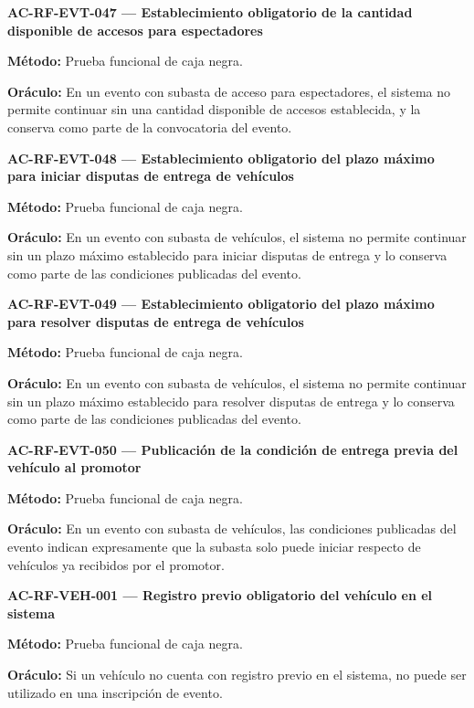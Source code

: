 \documentclass[10pt,letterpaper]{article}
\begin{document}
\noindent\textbf{AC-RF-EVT-047 --- Establecimiento obligatorio de la cantidad disponible de accesos para espectadores}\par
\textbf{Método:} Prueba funcional de caja negra.\par
\textbf{Oráculo:} En un evento con subasta de acceso para espectadores, el sistema no permite continuar sin una cantidad disponible de accesos establecida, y la conserva como parte de la convocatoria del evento.\par\vspace{0.45em}
\noindent\textbf{AC-RF-EVT-048 --- Establecimiento obligatorio del plazo máximo para iniciar disputas de entrega de vehículos}\par
\textbf{Método:} Prueba funcional de caja negra.\par
\textbf{Oráculo:} En un evento con subasta de vehículos, el sistema no permite continuar sin un plazo máximo establecido para iniciar disputas de entrega y lo conserva como parte de las condiciones publicadas del evento.\par\vspace{0.45em}
\noindent\textbf{AC-RF-EVT-049 --- Establecimiento obligatorio del plazo máximo para resolver disputas de entrega de vehículos}\par
\textbf{Método:} Prueba funcional de caja negra.\par
\textbf{Oráculo:} En un evento con subasta de vehículos, el sistema no permite continuar sin un plazo máximo establecido para resolver disputas de entrega y lo conserva como parte de las condiciones publicadas del evento.\par\vspace{0.45em}
\noindent\textbf{AC-RF-EVT-050 --- Publicación de la condición de entrega previa del vehículo al promotor}\par
\textbf{Método:} Prueba funcional de caja negra.\par
\textbf{Oráculo:} En un evento con subasta de vehículos, las condiciones publicadas del evento indican expresamente que la subasta solo puede iniciar respecto de vehículos ya recibidos por el promotor.\par\vspace{0.45em}
\noindent\textbf{AC-RF-VEH-001 --- Registro previo obligatorio del vehículo en el sistema}\par
\textbf{Método:} Prueba funcional de caja negra.\par
\textbf{Oráculo:} Si un vehículo no cuenta con registro previo en el sistema, no puede ser utilizado en una inscripción de evento.\par\vspace{0.45em}
\end{document}
